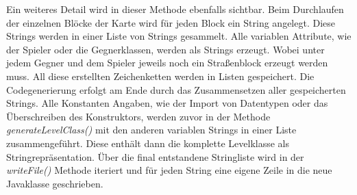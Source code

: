 Ein weiteres Detail wird in dieser Methode ebenfalls sichtbar. Beim Durchlaufen der einzelnen Blöcke der Karte wird für jeden Block ein String angelegt. Diese Strings werden in einer Liste von Strings gesammelt.\newline
Alle variablen Attribute, wie der Spieler oder die Gegnerklassen,  werden als Strings erzeugt. Wobei unter jedem Gegner und dem Spieler jeweils noch ein Straßenblock erzeugt werden muss. All diese erstellten Zeichenketten werden in Listen gespeichert. \newline
Die Codegenerierung erfolgt am Ende durch das Zusammensetzen aller gespeicherten Strings. Alle Konstanten Angaben, wie der Import von Datentypen oder das Überschreiben des Konstruktors, werden zuvor in der Methode \textit{generateLevelClass()} mit den anderen variablen Strings in einer Liste zusammengeführt. Diese enthält dann die komplette Levelklasse als Stringrepräsentation.\newline 
Über die final entstandene Stringliste wird in der \textit{writeFile()} Methode iteriert und für jeden String eine eigene Zeile in die neue Javaklasse geschrieben.
